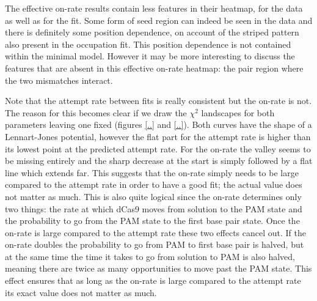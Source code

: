 

The effective on-rate results contain less features in their heatmap, for the data as well as for the fit. Some form of seed region can indeed be seen in the data and there is definitely some position dependence, on account of the striped pattern also present in the occupation fit. This position dependence is not contained within the minimal model. However it may be more interesting to discuss the features that are absent in this effective on-rate heatmap: the pair region where the two mismatches interact.

Note that the attempt rate between fits is really consistent but the on-rate is not. The reason for this becomes clear if we draw the $\chi^2$ landscapes for both parameters leaving one fixed (figures \ref{..} and \ref{..}). Both curves have the shape of a Lennart-Jones potential, however the flat part for the attempt rate is higher than its lowest point at the predicted attempt rate. For the on-rate the valley seems to be missing entirely and the sharp decrease at the start is simply followed by a flat line which extends far. This suggests that the on-rate simply needs to be large compared to the attempt rate in order to have a good fit; the actual value does not matter as much. This is also quite logical since the on-rate determines only two things: the rate at which dCas9 moves from solution to the PAM state and the probability to go from the PAM state to the first base pair state. Once the on-rate is large compared to the attempt rate these two effects cancel out. If the on-rate doubles the probability to go from PAM to first base pair is halved, but at the same time the time it takes to go from solution to PAM is also halved, meaning there are twice as many opportunities to move past the PAM state. This effect ensures that as long as the on-rate is large compared to the attempt rate its exact value does not matter as much.

